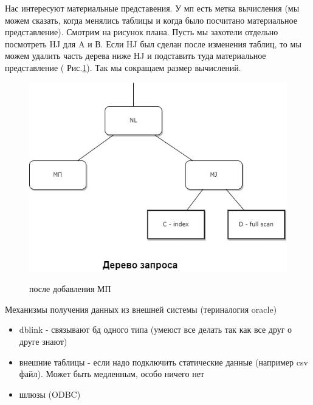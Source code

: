 Нас интересуют материальные представения. У мп есть метка вычисления (мы можем сказать, когда менялись таблицы и когда было посчитано материальное представление). Смотрим на рисунок плана. Пусть мы захотели отдельно посмотреть HJ для A и В. Если HJ был сделан после изменения таблиц, то мы можем удалить часть дерева ниже HJ и подставить туда материальное представление ( Рис.\ref{fig:plan2}). Так мы сокращаем размер вычислений.  

 \begin{figure}[h!]
     \centering
     \includegraphics[scale = 0.5]{5/plan2.jpg}
     \label{fig:plan2}
     \caption{после добавления МП}
 \end{figure}

Механизмы получения данных из внешней системы (териналогия  oracle)
\begin{itemize}
    \item  dblink -  связывают бд одного типа (умеюст все делать так как все друг о друге знают)
    \item внешние таблицы - если надо подключить статические данные (например csv файл). Может быть медленным, особо ничего нет
    \item шлюзы (ODBC) 
\end{itemize}
